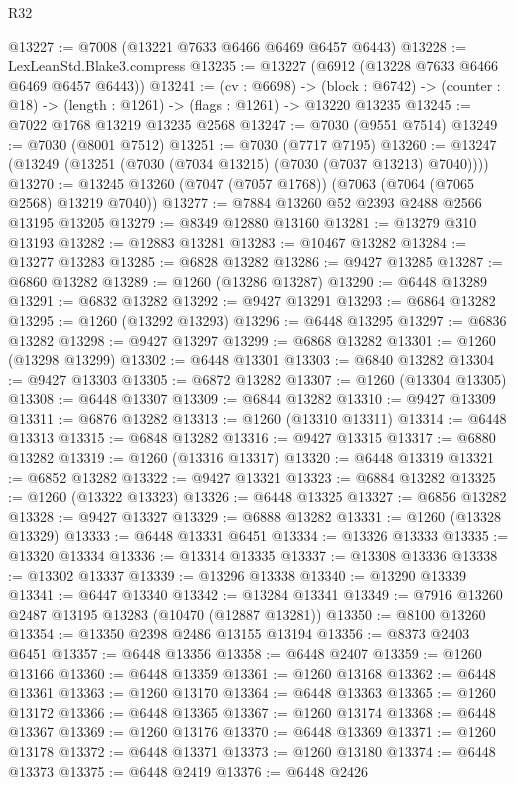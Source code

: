 \begin{lexlean}{R32}
\begin{coremodule}
@13227 := @7008 (@13221 @7633 @6466 @6469 @6457 @6443)
@13228 := LexLeanStd.Blake3.compress
@13235 := @13227 (@6912 (@13228 @7633 @6466 @6469 @6457 @6443))
@13241 := (cv : @6698) ->
  (block : @6742) -> (counter : @18) -> (length : @1261) -> (flags : @1261) -> @13220 @13235
@13245 := @7022 @1768 @13219 @13235 @2568
@13247 := @7030 (@9551 @7514)
@13249 := @7030 (@8001 @7512)
@13251 := @7030 (@7717 @7195)
@13260 := @13247 (@13249 (@13251 (@7030 (@7034 @13215) (@7030 (@7037 @13213) @7040))))
@13270 := @13245 @13260 (@7047 (@7057 @1768)) (@7063 (@7064 (@7065 @2568) @13219 @7040))
@13277 := @7884 @13260 @52 @2393 @2488 @2566 @13195 @13205
@13279 := @8349 @12880 @13160
@13281 := @13279 @310 @13193
@13282 := @12883 @13281
@13283 := @10467 @13282
@13284 := @13277 @13283
@13285 := @6828 @13282
@13286 := @9427 @13285
@13287 := @6860 @13282
@13289 := @1260 (@13286 @13287)
@13290 := @6448 @13289
@13291 := @6832 @13282
@13292 := @9427 @13291
@13293 := @6864 @13282
@13295 := @1260 (@13292 @13293)
@13296 := @6448 @13295
@13297 := @6836 @13282
@13298 := @9427 @13297
@13299 := @6868 @13282
@13301 := @1260 (@13298 @13299)
@13302 := @6448 @13301
@13303 := @6840 @13282
@13304 := @9427 @13303
@13305 := @6872 @13282
@13307 := @1260 (@13304 @13305)
@13308 := @6448 @13307
@13309 := @6844 @13282
@13310 := @9427 @13309
@13311 := @6876 @13282
@13313 := @1260 (@13310 @13311)
@13314 := @6448 @13313
@13315 := @6848 @13282
@13316 := @9427 @13315
@13317 := @6880 @13282
@13319 := @1260 (@13316 @13317)
@13320 := @6448 @13319
@13321 := @6852 @13282
@13322 := @9427 @13321
@13323 := @6884 @13282
@13325 := @1260 (@13322 @13323)
@13326 := @6448 @13325
@13327 := @6856 @13282
@13328 := @9427 @13327
@13329 := @6888 @13282
@13331 := @1260 (@13328 @13329)
@13333 := @6448 @13331 @6451
@13334 := @13326 @13333
@13335 := @13320 @13334
@13336 := @13314 @13335
@13337 := @13308 @13336
@13338 := @13302 @13337
@13339 := @13296 @13338
@13340 := @13290 @13339
@13341 := @6447 @13340
@13342 := @13284 @13341
@13349 := @7916 @13260 @2487 @13195 @13283 (@10470 (@12887 @13281))
@13350 := @8100 @13260
@13354 := @13350 @2398 @2486 @13155 @13194
@13356 := @8373 @2403 @6451
@13357 := @6448 @13356
@13358 := @6448 @2407
@13359 := @1260 @13166
@13360 := @6448 @13359
@13361 := @1260 @13168
@13362 := @6448 @13361
@13363 := @1260 @13170
@13364 := @6448 @13363
@13365 := @1260 @13172
@13366 := @6448 @13365
@13367 := @1260 @13174
@13368 := @6448 @13367
@13369 := @1260 @13176
@13370 := @6448 @13369
@13371 := @1260 @13178
@13372 := @6448 @13371
@13373 := @1260 @13180
@13374 := @6448 @13373
@13375 := @6448 @2419
@13376 := @6448 @2426

\end{coremodule}
\end{lexlean}
